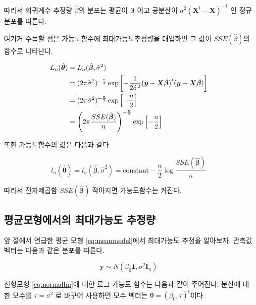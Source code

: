 \documentclass[
  10pt,
]{book}
\theoremstyle{definition}
\theoremstyle{definition}
\theoremstyle{definition}
\theoremstyle{definition}
\theoremstyle{remark}
\begin{document}
따라서 회귀계수 추정량 \(\hat { \beta}\)의 분포는 평균이 \(\bm \beta\) 이고
공분산이 \(\sigma^2( {\bm X}^t - \bm X)^{-1}\) 인 정규분포를 따른다.

여기거 주목할 점은 가능도함수에 최대가능도추정량을 대입하면 그 값이
\(SSE(\hat { \beta})\)의 함수로 나타난다.

\begin{align}
 L_n(\hat { \bm \theta} ) & = L_n(\hat { \bm \beta} ,\hat \sigma^2 ) \notag \\
 &=  (2\pi\hat \sigma^2)^{-\frac{n}{2}} \exp \left [-\frac{1}{2 \hat \sigma^2}( \bm y- \bm X \hat { \bm \beta})^t( \bm y- \bm X \hat { \bm \beta} ) \right ] \notag  \\
& = (2\pi\hat \sigma^2)^{-\frac{n}{2}} \exp \left [-\frac{n}{2} \right ]  \notag  \\
& = \left (2\pi \frac{SSE(\hat { \bm \beta})}{n} \right )^{-\frac{n}{2}} \exp \left [-\frac{n}{2} \right ] 
\label{eq:likefull}
\end{align}

또한 가능도함수의 값은 다음과 같다.

\begin{equation}
l_n(\hat { \bm \theta} ) = l_n(\hat { \bm \beta} ,\hat \sigma^2 ) 
= \text{constant}  - \frac{n}{2} \log \frac{SSE(\hat { \bm \beta})}{n}
\label{eq:linregloglike}
\end{equation}

따라서 잔차제곱함 \(SSE(\hat { \bm \beta})\) 작아지면
가능도함수는 커진다.

\hypertarget{uxd3c9uxade0uxbaa8uxd615uxc5d0uxc11cuxc758-uxcd5cuxb300uxac00uxb2a5uxb3c4-uxcd94uxc815uxb7c9}{%
\subsection{평균모형에서의 최대가능도 추정량}\label{uxd3c9uxade0uxbaa8uxd615uxc5d0uxc11cuxc758-uxcd5cuxb300uxac00uxb2a5uxb3c4-uxcd94uxc815uxb7c9}}

앞 절에서 언급한 평균 모형 \eqref{eq:meanmodel}에서 최대가능도 추정을 알아보자. 관측값 벡터는 다음과 같은 분포를 따른다.

\begin{equation}
\bm y \sim N( \beta_0 \bm 1 , \sigma^2 \bm I_n) 
\label{eq:meanlm}
\end{equation}

선형모형 \eqref{eq:normallm}에 대한 로그 가능도 함수는 다음과 같이 주어진다. 분산에 대한 모수를 \(\tau=\sigma^2\) 로 바꾸어 사용하면 모수 벡터는 \(\bm \theta = (\beta_0, \tau)^t\)이다.
\end{document}
